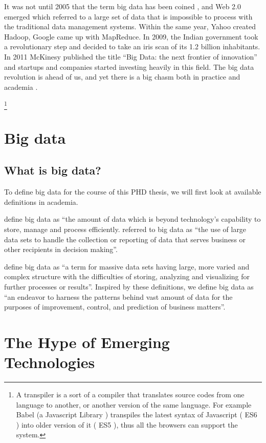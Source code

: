 It was not until 2005 that the term big data has been coined \cite{Long2015}, and Web 2.0 emerged which referred to a large set of data that is impossible to process with the traditional data management systems. Within the same year, Yahoo created Hadoop, Google came up with MapReduce. In 2009, the Indian government took a revolutionary step and decided to take an iris scan of its 1.2 billion inhabitants. In 2011 McKinesy published the title “Big Data: the next frontier of innovation” and startups and companies started investing heavily in this field. The big data revolution is ahead of us, and yet there is a big chasm both in practice and academia \cite{mckinsey2011big}.

\footnote{A transpiler is a sort of a compiler that translates source codes from one language to another, or another version of the same language. For example Babel (a Javascript Library ) transpiles the latest syntax of Javascript ( ES6 ) into older version of it ( ES5 ), thus all the browsers can support the system.}

\section{Big data}\label{Big Data}
\subsection{What is big data?}\label{What is big data?}

To define big data for the course of this PHD thesis, we will first look at available definitions in academia.

\citeauthor{Kaisler2013} define big data as “the amount of data which is beyond technology’s capability to store, manage and process efficiently.\citeauthor{Srivastava2018} referred to big data as “the use of large data sets to handle the collection or reporting of data that serves business or other recipients in decision making”.

\citeauthor{Sagiroglu2013} define big data as “a term for massive data sets having large, more varied and complex structure with the difficulties of storing, analyzing and visualizing for further processes or results”.  Inspired by these definitions, we define big data as “an endeavor to harness the patterns behind vast amount of data for the purposes of improvement, control, and prediction of business matters”.

\section{The Hype of Emerging Technologies}

